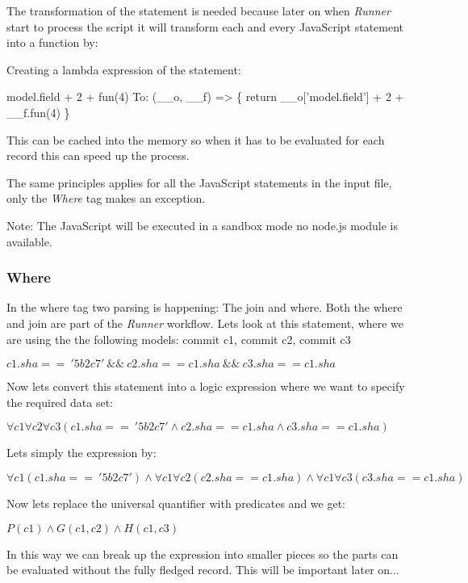 The transformation of the statement is needed because later on when \textit{Runner} start to process the script
it will transform each and every JavaScript statement into a function by:

Creating a lambda expression of the statement: 

 model.field + 2 + fun(4)\newline 
 To:\newline
 (\_\_o, \_\_f) => \{ return \_\_o['model.field'] + 2 + \_\_f.fun(4) \}\newline

This can be cached into the memory so when it has to be evaluated for each record this can speed up the process.

The same principles applies for all the JavaScript statements in the input file, only the \textit{Where} tag makes an exception. 

Note: The JavaScript will be executed in a sandbox mode no node.js module is
available. 

\subsubsection{Where}

In the where tag two parsing is happening: The join and where. Both the where and join are part of the \textit{Runner} workflow. Lets look at this statement, where we are using the the following models: commit c1, commit c2, commit c3

\( c1.sha ==\ '5b2c7'\ \&\&\ c2.sha == c1.sha\ \&\&\ c3.sha == c1.sha\)

Now lets convert this statement into a logic expression where we want to specify the required
data set:

\( \forall{c1}\forall{c2}\forall{c3}(c1.sha ==\ '5b2c7' \wedge c2.sha == c1.sha \wedge c3.sha == c1.sha)\)

Lets simply the expression by:

\( \forall{c1}(c1.sha ==\ '5b2c7') \wedge \forall{c1}\forall{c2}(c2.sha == c1.sha) \wedge \forall{c1}\forall{c3}(c3.sha == c1.sha)\)

Now lets replace the universal quantifier with predicates and we get:

\( P(c1) \wedge G(c1,c2) \wedge H(c1,c3)\)

In this way we can break up the expression into smaller pieces so the parts can be evaluated
without the fully fledged record. This will be important later on...

